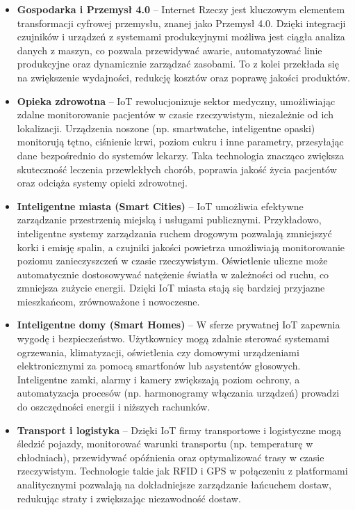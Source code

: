     \begin{itemize}
    \item \textbf{Gospodarka i Przemysł 4.0} – Internet Rzeczy jest kluczowym elementem transformacji cyfrowej przemysłu, znanej jako Przemysł 4.0. Dzięki integracji czujników i urządzeń z systemami produkcyjnymi możliwa jest ciągła analiza danych z maszyn, co pozwala przewidywać awarie, automatyzować linie produkcyjne oraz dynamicznie zarządzać zasobami. To z kolei przekłada się na zwiększenie wydajności, redukcję kosztów oraz poprawę jakości produktów.

    \item \textbf{Opieka zdrowotna} – IoT rewolucjonizuje sektor medyczny, umożliwiając zdalne monitorowanie pacjentów w czasie rzeczywistym, niezależnie od ich lokalizacji. Urządzenia noszone (np. smartwatche, inteligentne opaski) monitorują tętno, ciśnienie krwi, poziom cukru i inne parametry, przesyłając dane bezpośrednio do systemów lekarzy. Taka technologia znacząco zwiększa skuteczność leczenia przewlekłych chorób, poprawia jakość życia pacjentów oraz odciąża systemy opieki zdrowotnej.

    \item \textbf{Inteligentne miasta (Smart Cities)} – IoT umożliwia efektywne zarządzanie przestrzenią miejską i usługami publicznymi. Przykładowo, inteligentne systemy zarządzania ruchem drogowym pozwalają zmniejszyć korki i emisję spalin, a czujniki jakości powietrza umożliwiają monitorowanie poziomu zanieczyszczeń w czasie rzeczywistym. Oświetlenie uliczne może automatycznie dostosowywać natężenie światła w zależności od ruchu, co zmniejsza zużycie energii. Dzięki IoT miasta stają się bardziej przyjazne mieszkańcom, zrównoważone i nowoczesne.

    \item \textbf{Inteligentne domy (Smart Homes)} – W sferze prywatnej IoT zapewnia wygodę i bezpieczeństwo. Użytkownicy mogą zdalnie sterować systemami ogrzewania, klimatyzacji, oświetlenia czy domowymi urządzeniami elektronicznymi za pomocą smartfonów lub asystentów głosowych. Inteligentne zamki, alarmy i kamery zwiększają poziom ochrony, a automatyzacja procesów (np. harmonogramy włączania urządzeń) prowadzi do oszczędności energii i niższych rachunków.

    \item \textbf{Transport i logistyka} – Dzięki IoT firmy transportowe i logistyczne mogą śledzić pojazdy, monitorować warunki transportu (np. temperaturę w chłodniach), przewidywać opóźnienia oraz optymalizować trasy w czasie rzeczywistym. Technologie takie jak RFID i GPS w połączeniu z platformami analitycznymi pozwalają na dokładniejsze zarządzanie łańcuchem dostaw, redukując straty i zwiększając niezawodność dostaw.


\end{itemize}
